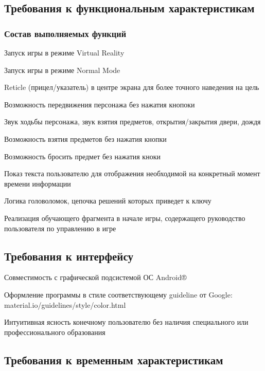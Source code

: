 \subsection{Требования к функциональным характеристикам}

\subsubsection{Состав выполняемых функций}
\begin{my_enumerate}
\item Запуск игры в режиме Virtual Reality
\item Запуск игры в режиме Normal Mode
\item Reticle (прицел/указатель) в центре экрана для более точного наведения на цель
\item Возможность передвижения персонажа без нажатия кнопоки
\item Звук ходьбы персонажа, звук взятия предметов, открытия/закрытия двери, дождя
\item Возможность взятия предметов без нажатия кнопки
\item Возможность бросить предмет без нажатия кноки
\item Показ текста пользователю для отображения необходимой на конкретный момент времени информации
\item Логика головоломок, цепочка решений которых приведет к ключу
\item Реализация обучающего фрагмента в начале игры, содержащего руководство пользователя по управлению в игре
\end{my_enumerate}


\subsection{Требования к интерфейсу}

\begin{my_enumerate}
\item Совместимость с графической подсистемой ОС Android®
\item Оформление программы в стиле соответствующему guideline от Google:\\ material.io/guidelines/style/color.html
\item Интуитивная ясность конечному пользователю без наличия специального или профессионального образования
\end{my_enumerate}


\subsection{Требования к временным характеристикам}
